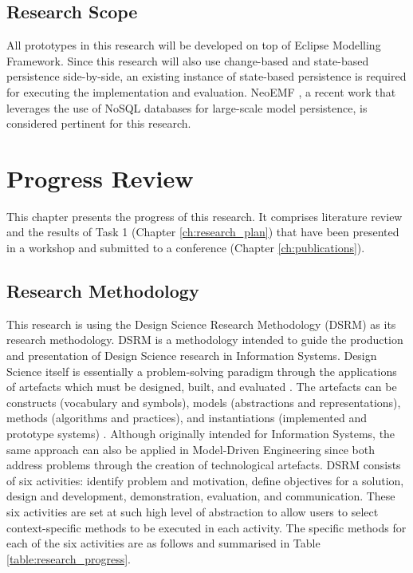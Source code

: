 \documentclass[12pt, a4paper]{report} \usepackage[titletoc]{appendix}
\begin{document}
\section{Research Scope}
\label{sec:research_scope}
All prototypes in this research will be developed on top of Eclipse Modelling Framework. Since this research will also use change-based and state-based persistence side-by-side, an existing instance of state-based persistence is required for executing the implementation and evaluation. NeoEMF \cite{daniel2016neoemf}, a recent work that leverages the use of NoSQL databases for large-scale model persistence, is considered pertinent for this research. 

\chapter{Progress Review}
\label{ch:progress_review}
This chapter presents the progress of this research. It comprises literature review and the results of Task 1 (Chapter \ref{ch:research_plan}) that have been presented in a workshop and submitted to a conference (Chapter \ref{ch:publications}). 

\section{Research Methodology}
\label{sec:research_methodology}
This research is using the Design Science Research Methodology (DSRM) \cite{peffers2007design} as its research methodology. DSRM is a methodology intended to guide the production and presentation of Design Science research in Information Systems. Design Science itself is essentially a problem-solving paradigm through the applications of artefacts which must be designed, built, and evaluated \cite{hevner2010design}. The artefacts can be constructs (vocabulary and symbols), models (abstractions and representations), methods (algorithms and practices), and instantiations (implemented and prototype systems) \cite{hevner2004design}. Although originally intended for Information Systems, the same approach can also be applied in Model-Driven Engineering since both address problems through the creation of technological artefacts. DSRM consists of six activities: identify problem and motivation, define objectives for a solution, design and development, demonstration, evaluation, and communication. These six activities are set at such high level of abstraction to allow users to select context-specific methods to be executed in each activity. The specific methods for each of the six activities are as follows and summarised in Table \ref{table:research_progress}.
\end{document}
